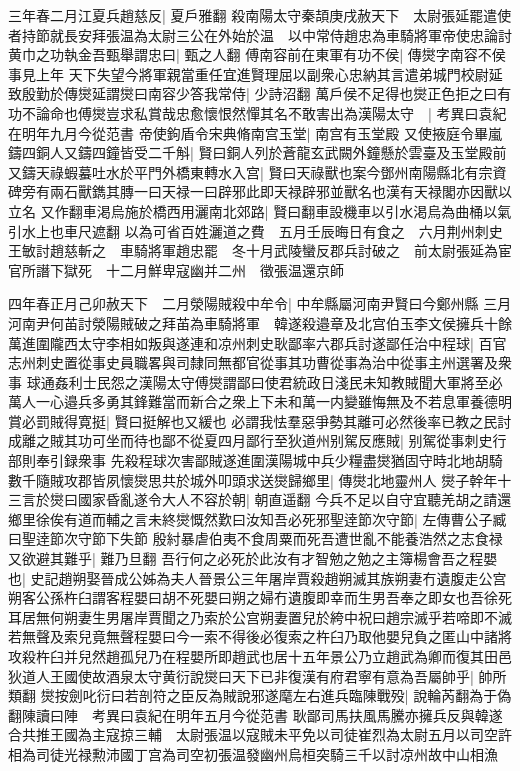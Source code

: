 三年春二月江夏兵趙慈反|{
	夏戶雅翻}
殺南陽太守秦頡庚戌赦天下　太尉張延罷遣使者持節就長安拜張温為太尉三公在外始於温　以中常侍趙忠為車騎將軍帝使忠論討黄巾之功執金吾甄舉謂忠曰|{
	甄之人翻}
傅南容前在東軍有功不侯|{
	傳爕字南容不侯事見上年}
天下失望今將軍親當重任宜進賢理屈以副衆心忠納其言遣弟城門校尉延致殷勤於傳爕延謂爕曰南容少答我常侍|{
	少詩沼翻}
萬戶侯不足得也爕正色拒之曰有功不論命也傅爕豈求私賞哉忠愈懷恨然憚其名不敢害出為漢陽太守　|{
	考異曰袁紀在明年九月今從范書}
帝使鉤盾令宋典脩南宫玉堂|{
	南宫有玉堂殿}
又使掖庭令畢嵐鑄四銅人又鑄四鐘皆受二千斛|{
	賢曰銅人列於蒼龍玄武闕外鐘懸於雲臺及玉堂殿前}
又鑄天祿蝦蟇吐水於平門外橋東轉水入宫|{
	賢曰天祿獸也案今鄧州南陽縣北有宗資碑旁有兩石獸鐫其膞一曰天禄一曰辟邪此即天禄辟邪並獸名也漢有天禄閣亦因獸以立名}
又作翻車渇烏施於橋西用灑南北郊路|{
	賢曰翻車設機車以引水渇烏為曲桶以氣引水上也車尺遮翻}
以為可省百姓灑道之費　五月壬辰晦日有食之　六月荆州刺史王敏討趙慈斬之　車騎將軍趙忠罷　冬十月武陵蠻反郡兵討破之　前太尉張延為宦官所譖下獄死　十二月鮮卑寇幽并二州　徵張温還京師

四年春正月己卯赦天下　二月滎陽賊殺中牟令|{
	中牟縣屬河南尹賢曰今鄭州縣}
三月河南尹何苖討滎陽賊破之拜苖為車騎將軍　韓遂殺邉章及北宫伯玉李文侯擁兵十餘萬進圍隴西太守李相如叛與遂連和凉州刺史耿鄙率六郡兵討遂鄙任治中程球|{
	百官志州刺史置從事史員職畧與司隸同無都官從事其功曹從事為治中從事主州選署及衆事}
球通姦利士民怨之漢陽太守傅爕謂鄙曰使君統政日淺民未知教賊聞大軍將至必萬人一心邉兵多勇其鋒難當而新合之衆上下未和萬一内變雖悔無及不若息軍養德明賞必罰賊得寛挺|{
	賢曰挺解也又緩也}
必謂我怯羣惡爭勢其離可必然後率已教之民討成離之賊其功可坐而待也鄙不從夏四月鄙行至狄道州别駕反應賊|{
	别駕從事刺史行部則奉引録衆事}
先殺程球次害鄙賊遂進圍漢陽城中兵少糧盡爕猶固守時北地胡騎數千隨賊攻郡皆夙懷爕思共於城外叩頭求送爕歸鄉里|{
	傳爕北地靈州人}
爕子幹年十三言於爕曰國家昏亂遂令大人不容於朝|{
	朝直遥翻}
今兵不足以自守宜聽羌胡之請還鄉里徐俟有道而輔之言未終爕慨然歎曰汝知吾必死邪聖逹節次守節|{
	左傳曹公子臧曰聖逹節次守節下失節}
殷紂暴虐伯夷不食周粟而死吾遭世亂不能養浩然之志食禄又欲避其難乎|{
	難乃旦翻}
吾行何之必死於此汝有才智勉之勉之主簿楊會吾之程嬰也|{
	史記趙朔娶晉成公姊為夫人晉景公三年屠岸賈殺趙朔滅其族朔妻冇遺腹走公宫朔客公孫杵臼謂客程嬰曰胡不死嬰曰朔之婦冇遺腹即幸而生男吾奉之即女也吾徐死耳居無何朔妻生男屠岸賈聞之乃索於公宫朔妻置兒於絝中祝曰趙宗滅乎若啼即不滅若無聲及索兒竟無聲程嬰曰今一索不得後必復索之杵臼乃取他嬰兒負之匿山中諸將攻殺杵臼并兒然趙孤兒乃在程嬰所即趙武也居十五年景公乃立趙武為卿而復其田邑}
狄道人王國使故酒泉太守黄衍說爕曰天下已非復漢有府君寧有意為吾屬帥乎|{
	帥所類翻}
爕按劍叱衍曰若剖符之臣反為賊說邪遂麾左右進兵臨陳戰殁|{
	說輪芮翻為于偽翻陳讀曰陣　考異曰袁紀在明年五月今從范書}
耿鄙司馬扶風馬騰亦擁兵反與韓遂合共推王國為主寇掠三輔　太尉張温以寇賊未平免以司徒崔烈為太尉五月以司空許相為司徒光禄勲沛國丁宫為司空初張温發幽州烏桓突騎三千以討凉州故中山相漁

